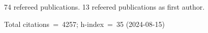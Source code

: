 74 refereed publications. 13 refeered publications as first author.

Total citations~=~4257; h-index~=~35 (2024-08-15)